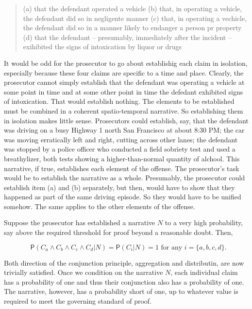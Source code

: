 \documentclass[10pt,dvipsnames,enabledeprecatedfontcommands]{scrartcl}
\newcommand{\pr}[1]{\mathsf{P}(#1)}
\begin{document}
\begin{quote}
(a) that the defendant operated a vehicle
(b) that, in operating a vehicle, the defendant did so in  negligente manner
(c) that, in operating a vechicle, the defendant did so in a manner likely to endanger a person pr property
(d) that the defendant -- presumably, immediately after the incident -- exihibited the signs of intoxication by liquor or drugs
\end{quote}

\noindent It would be odd for the prosecutor to go about establishig
each claim in isolation, especially because these four claims are
specific to a time and place. Clearly, the prosecutor cannot simply
establish that the defendant was operating a vehicle at some point in
time and at some other point in time the defedant exhibited signs of
intoxication. That would establish nothing. The elements to be
established must be combined in a coherent spatio-temporal narrative. So
establishing them in isolation makes little sense. Prosecutors could
establish, say, that the defendant was driving on a busy Highway 1 north
San Francisco at about 8:30 PM; the car was moving erratically left and
right, cutting across other lanes; the defendant was stopped by a police
officer who conducted a field sobriety test and used a breathylizer,
both tests showing a higher-than-normal quantity of alchool. This
narrative, if true, establishes each element of the offense. The
prosecutor's task would be to establish the narrative as a whole.
Presumably, the prosecutor could establish item (a) and (b) separately,
but then, would have to show that they happened as part of the same
driving episode. So they would have to be unified somehow. The same
applies to the other elements of the offense.

Suppose the prosecutor has established a narrative \(N\) to a very high
probability, say above the required threshold for proof beyond a
reasonable doubt. Then,

\[\text{ $\pr{C_a\wedge C_b \wedge C_c\wedge C_d \vert N}=\pr{C_i \vert N}=1$ for any $i=\{a, b, c, d\}$}.\]

\noindent Both direction of the conjunction principle, aggregation and
distributin, are now trivially satisfied. Once we condition on the
narrative \(N\), each individual claim has a probability of one and thus
their conjunction also has a probability of one. The narrative, however,
has a probability short of one, up to whatever value is required to meet
the governing standard of proof.
\end{document}
